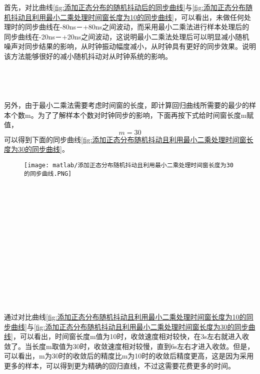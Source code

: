 首先，对比曲线\ref{fig:添加正态分布的随机抖动后的同步曲线}与\ref{fig:添加正态分布随机抖动且利用最小二乘处理时间窗长度为10的同步曲线}，可以看出，未做任何处理时的同步曲线在-80ns－+80ns之间波动，而采用最小二乘法进行样本处理后的同步曲线在-20ns－+20ns之间波动，这说明最小二乘法处理后可以明显减小随机噪声对同步结果的影响，从时钟振动幅度减小，从时钟具有更好的同步效果。说明该方法能够很好的减小随机抖动对从时钟系统的影响。
\\ \\ \\ \\ \\
另外，由于最小二乘法需要考虑时间窗的长度，即计算回归曲线所需要的最少的样本个数m。为了了解样本个数对时钟同步的影响，下面再按下式给时间窗长度m赋值，
\begin{equation}
  m = 30
\end{equation}
可以得到下面的同步曲线\ref{fig:添加正态分布随机抖动且利用最小二乘处理时间窗长度为30的同步曲线}。
\begin{figure}[htbp]
  \centering
  \begin{minipage}[b]{1\textwidth}
    \captionstyle{\centering}
    \centering
    \texttt{[image: matlab/添加正态分布随机抖动且利用最小二乘处理时间窗长度为30的同步曲线.PNG]}
  \end{minipage}     
\end{figure}
\\ \\ \\ \\ \\ \\ \\ \\ \\ \\ \\ \\ \\

通过对比曲线\ref{fig:添加正态分布随机抖动且利用最小二乘处理时间窗长度为10的同步曲线}与\ref{fig:添加正态分布随机抖动且利用最小二乘处理时间窗长度为30的同步曲线}，可以看出，时间窗长度m值为10时，收敛速度相对较快，在3s左右就进入收敛了。当长度m取值为30时，收敛速度相对较慢，直到6s左右才进入收敛。但是，可以看出，m为30时的收敛后的精度比m为10时的收敛后精度更高，这是因为采用更多的样本，可以得到更为精确的回归直线，不过这需要花费更多的时间。

